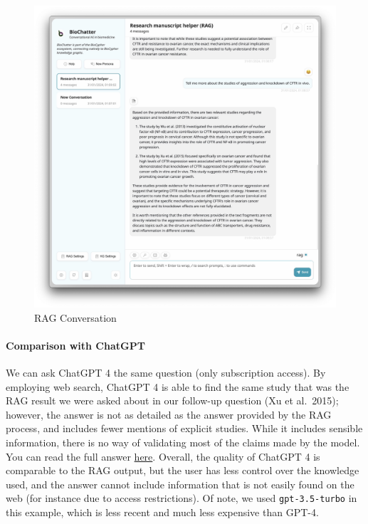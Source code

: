 \begin{fignos:no-prefix-figure-caption}

\begin{figure}
\centering
\includegraphics{images/rag-demo.png}
\caption{RAG Conversation}
\end{figure}

\end{fignos:no-prefix-figure-caption}

\hypertarget{comparison-with-chatgpt}{%
\paragraph{Comparison with ChatGPT}\label{comparison-with-chatgpt}}

We can ask ChatGPT 4 the same question (only subscription access). By employing
web search, ChatGPT 4 is able to find the same study that was the RAG result we
were asked about in our follow-up question (Xu et al.~2015); however, the answer
is not as detailed as the answer provided by the RAG process, and includes fewer
mentions of explicit studies. While it includes sensible information, there is
no way of validating most of the claims made by the model. You can read the
full answer
\href{https://chat.openai.com/share/549f5bf7-b39c-42a4-9483-d07dcbf5b2d9}{here}.
Overall, the quality of ChatGPT 4 is comparable to the RAG output, but the user
has less control over the knowledge used, and the answer cannot include
information that is not easily found on the web (for instance due to access
restrictions). Of note, we used \texttt{gpt-3.5-turbo} in this example, which is less
recent and much less expensive than GPT-4.

